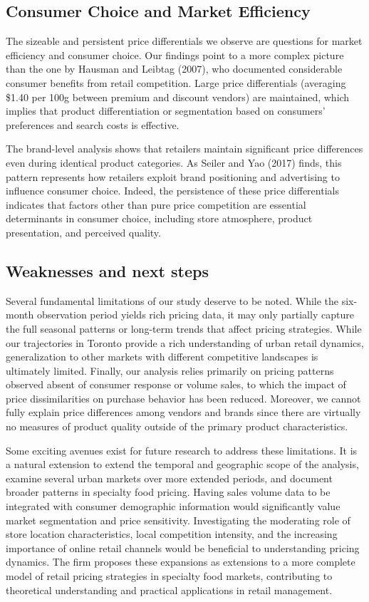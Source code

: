 \documentclass[
  letterpaper,
  DIV=11,
  numbers=noendperiod]{scrartcl}
\begin{document}
\subsection{Consumer Choice and Market
Efficiency}\label{consumer-choice-and-market-efficiency}

The sizeable and persistent price differentials we observe are questions
for market efficiency and consumer choice. Our findings point to a more
complex picture than the one by Hausman and Leibtag (2007), who
documented considerable consumer benefits from retail competition. Large
price differentials (averaging \$1.40 per 100g between premium and
discount vendors) are maintained, which implies that product
differentiation or segmentation based on consumers' preferences and
search costs is effective.

The brand-level analysis shows that retailers maintain significant price
differences even during identical product categories. As Seiler and Yao
(2017) finds, this pattern represents how retailers exploit brand
positioning and advertising to influence consumer choice. Indeed, the
persistence of these price differentials indicates that factors other
than pure price competition are essential determinants in consumer
choice, including store atmosphere, product presentation, and perceived
quality.

\subsection{Weaknesses and next steps}\label{weaknesses-and-next-steps}

Several fundamental limitations of our study deserve to be noted. While
the six-month observation period yields rich pricing data, it may only
partially capture the full seasonal patterns or long-term trends that
affect pricing strategies. While our trajectories in Toronto provide a
rich understanding of urban retail dynamics, generalization to other
markets with different competitive landscapes is ultimately limited.
Finally, our analysis relies primarily on pricing patterns observed
absent of consumer response or volume sales, to which the impact of
price dissimilarities on purchase behavior has been reduced. Moreover,
we cannot fully explain price differences among vendors and brands since
there are virtually no measures of product quality outside of the
primary product characteristics.

Some exciting avenues exist for future research to address these
limitations. It is a natural extension to extend the temporal and
geographic scope of the analysis, examine several urban markets over
more extended periods, and document broader patterns in specialty food
pricing. Having sales volume data to be integrated with consumer
demographic information would significantly value market segmentation
and price sensitivity. Investigating the moderating role of store
location characteristics, local competition intensity, and the
increasing importance of online retail channels would be beneficial to
understanding pricing dynamics. The firm proposes these expansions as
extensions to a more complete model of retail pricing strategies in
specialty food markets, contributing to theoretical understanding and
practical applications in retail management.
\end{document}
